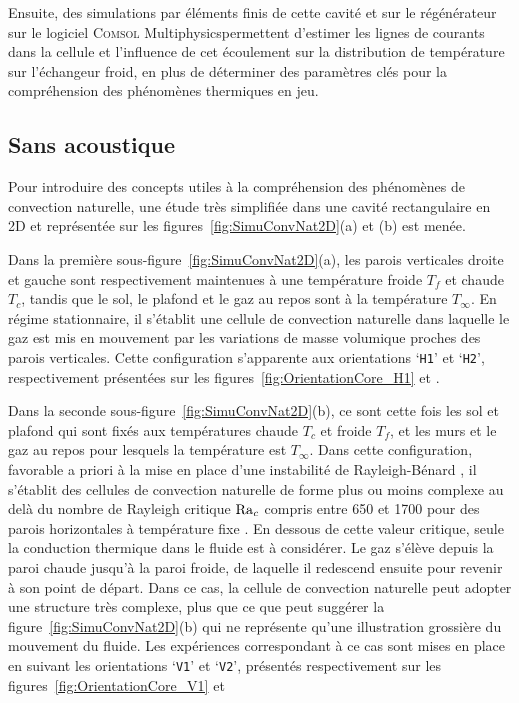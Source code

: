 Ensuite, des simulations par éléments finis de cette cavité et sur le régénérateur sur le logiciel \textsc{Comsol} Multiphysics\textss\textregistered permettent d'estimer les lignes de courants dans la cellule et l'influence de cet écoulement sur la distribution de température sur l'échangeur froid, en plus de déterminer des paramètres clés pour la compréhension des phénomènes thermiques en jeu.

\subsection{Sans acoustique}
Pour introduire des concepts utiles à la compréhension des phénomènes de convection naturelle, une étude très simplifiée dans une cavité rectangulaire en 2D et représentée sur les figures~\ref{fig:SimuConvNat2D}{\color{MatlabOrange}(a)} et {\color{MatlabOrange}(b)} est menée. 

Dans la première sous-figure~\ref{fig:SimuConvNat2D}{\color{MatlabOrange}(a)}, les parois verticales droite et gauche sont respectivement maintenues à une température froide $T_f$ et chaude $T_c$, tandis que le sol, le plafond et le gaz au repos sont à la température $T_\infty$. En régime stationnaire, il s'établit une cellule de convection naturelle dans laquelle le gaz est mis en mouvement par les  variations de masse volumique proches des parois verticales. Cette configuration s'apparente aux orientations `\texttt{H1}' et `\texttt{H2}', respectivement présentées sur les figures~\ref{fig:OrientationCore_H1} et .

Dans la seconde sous-figure~\ref{fig:SimuConvNat2D}{\color{MatlabOrange}(b)}, ce sont cette fois les sol et plafond qui sont fixés aux températures chaude $T_c$ et froide $T_f$, et les murs et le gaz au repos pour lesquels la température est $T_\infty$. Dans cette configuration, favorable a priori à la mise en place d'une instabilité de \og Rayleigh-Bénard \fg{}, il s'établit des cellules de convection naturelle de forme plus ou moins complexe au delà du nombre de Rayleigh critique $\mathrm{Ra}_c$ compris entre 650 et 1700 pour des parois horizontales à température fixe \cite{getling_rayleigh-benard_1998}. En dessous de cette valeur critique, seule la conduction thermique dans le fluide est à considérer. Le gaz s'élève depuis la paroi chaude jusqu'à la paroi froide, de laquelle il redescend ensuite pour revenir à son point de départ. Dans ce cas, la cellule de convection naturelle peut adopter une structure très complexe, plus que ce que peut suggérer la figure~\ref{fig:SimuConvNat2D}{\color{MatlabOrange}(b)} qui ne représente qu'une illustration grossière du mouvement du fluide. Les expériences correspondant à ce cas sont mises en place en suivant les orientations `\texttt{V1}' et `\texttt{V2}', présentés respectivement sur les figures~\ref{fig:OrientationCore_V1} et 

